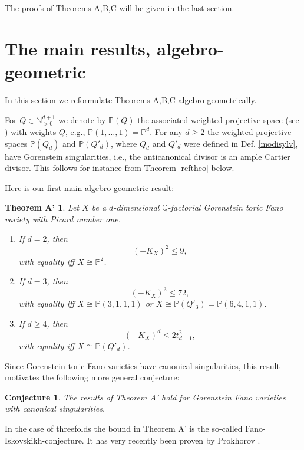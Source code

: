 \documentclass[a4paper,twoside]{article}
\def\N{{\mathbb N}}
\def\weights{\N_{>0}^{d+1}}
\def\P{{\mathbb P}}
\def\Q{{\mathbb Q}}
\def\KX{{K_X}}
\newtheorem*{theoremAs*}{Theorem A'}
\newtheorem{conjecture}[theorem]{Conjecture}
\begin{document}
\smallskip

The proofs of Theorems A,B,C will be given in the last section.

\section{The main results, algebro-geometric}
\label{main}

In this section we reformulate Theorems A,B,C algebro-geometrically. 

\smallskip

For $Q \in \weights$ we denote by $\P(Q)$ the associated weighted projective space (see \cite[p.35]{Ful93})
with weights $Q$, e.g., $\P(1,\ldots, 1) = \P^d$. For any $d \geq 2$ the weighted projective spaces $\P(Q_d)$ and 
$\P(Q'_d)$, where $Q_d$ and $Q'_d$ were defined in Def. \ref{modisylv}, 
have Gorenstein singularities, i.e., the anticanonical divisor is an ample Cartier divisor. This follows for instance from 
Theorem \ref{reftheo} below.

\smallskip

Here is our first main algebro-geometric result:

\begin{theoremAs*}
Let $X$ be a $d$-dimensional $\Q$-factorial Gorenstein toric Fano variety with Picard number one.
\begin{enumerate}
\item If $d=2$, then
\[(-\KX)^2 \leq 9,\]
with equality iff $X \cong \P^2$. 
\item If $d=3$, then
\[(-\KX)^3 \leq 72,\]
with equality iff $X \cong \P(3,1,1,1)$ or $X \cong \P(Q'_3) = \P(6,4,1,1)$.
\item If $d \geq 4$, then
\[(-\KX)^d \leq 2 t_{d-1}^2,\]
with equality iff $X \cong \P(Q'_d)$.
\end{enumerate}
\label{theA}
\end{theoremAs*}

Since Gorenstein toric Fano varieties have canonical singularities, this result motivates the following more general conjecture:

\begin{conjecture}{\rm 
The results of Theorem A' hold for Gorenstein Fano varieties with canonical singularities.
}
\end{conjecture}

In the case of threefolds the bound in Theorem A' is the so-called Fano-Iskovskikh-conjecture. 
It has very recently been proven by Prokhorov \cite{Pro05}. 
\end{document}
